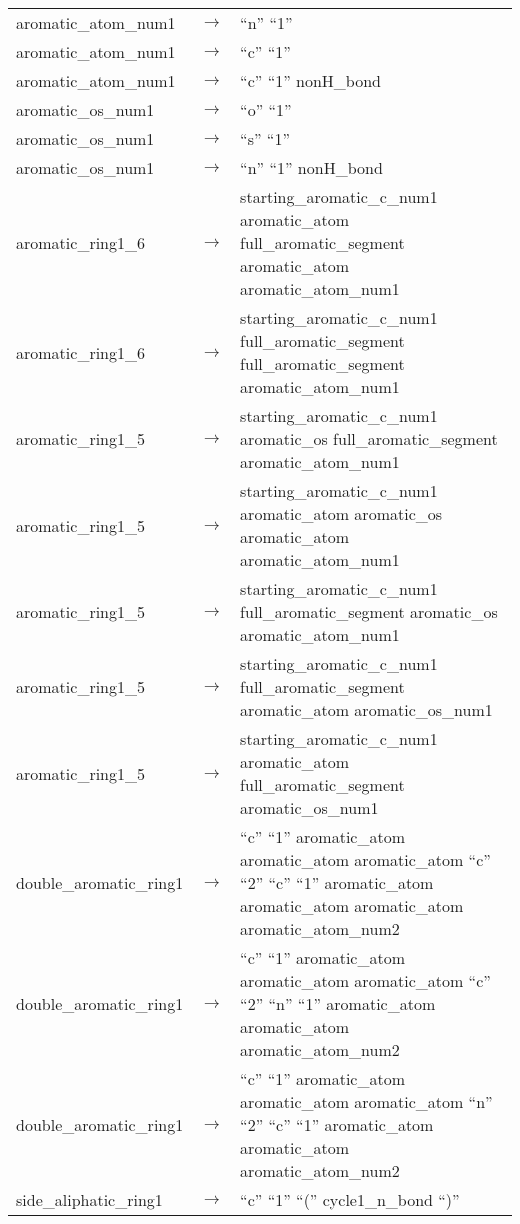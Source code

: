 \documentclass[../Document.tex]{subfiles}
\begin{document}
\begin{longtable}{m{} p{} p{}}
    aromatic\_atom\_num1 & $\rightarrow$ & ``n'' ``1'' \\
    aromatic\_atom\_num1 & $\rightarrow$ & ``c'' ``1'' \\
    aromatic\_atom\_num1 & $\rightarrow$ & ``c'' ``1'' nonH\_bond \\
    aromatic\_os\_num1 & $\rightarrow$ & ``o'' ``1'' \\
    aromatic\_os\_num1 & $\rightarrow$ & ``s'' ``1'' \\
    aromatic\_os\_num1 & $\rightarrow$ & ``n'' ``1'' nonH\_bond \\
    aromatic\_ring1\_6 & $\rightarrow$ & starting\_aromatic\_c\_num1 aromatic\_atom full\_aromatic\_segment aromatic\_atom aromatic\_atom\_num1 \\
    aromatic\_ring1\_6 & $\rightarrow$ & starting\_aromatic\_c\_num1 full\_aromatic\_segment full\_aromatic\_segment aromatic\_atom\_num1 \\
    aromatic\_ring1\_5 & $\rightarrow$ & starting\_aromatic\_c\_num1 aromatic\_os full\_aromatic\_segment aromatic\_atom\_num1 \\
    aromatic\_ring1\_5 & $\rightarrow$ & starting\_aromatic\_c\_num1 aromatic\_atom aromatic\_os aromatic\_atom aromatic\_atom\_num1 \\
    aromatic\_ring1\_5 & $\rightarrow$ & starting\_aromatic\_c\_num1 full\_aromatic\_segment aromatic\_os aromatic\_atom\_num1 \\
    aromatic\_ring1\_5 & $\rightarrow$ & starting\_aromatic\_c\_num1 full\_aromatic\_segment aromatic\_atom aromatic\_os\_num1 \\
    aromatic\_ring1\_5 & $\rightarrow$ & starting\_aromatic\_c\_num1 aromatic\_atom full\_aromatic\_segment aromatic\_os\_num1 \\
    double\_aromatic\_ring1 & $\rightarrow$ & ``c'' ``1'' aromatic\_atom aromatic\_atom aromatic\_atom ``c'' ``2'' ``c'' ``1'' aromatic\_atom aromatic\_atom aromatic\_atom aromatic\_atom\_num2 \\
    double\_aromatic\_ring1 & $\rightarrow$ & ``c'' ``1'' aromatic\_atom aromatic\_atom aromatic\_atom ``c'' ``2'' ``n'' ``1'' aromatic\_atom aromatic\_atom aromatic\_atom\_num2 \\
    double\_aromatic\_ring1 & $\rightarrow$ & ``c'' ``1'' aromatic\_atom aromatic\_atom aromatic\_atom ``n'' ``2'' ``c'' ``1'' aromatic\_atom aromatic\_atom aromatic\_atom\_num2 \\
    side\_aliphatic\_ring1 & $\rightarrow$ & ``c'' ``1'' ``('' cycle1\_n\_bond ``)'' \\

\end{longtable}
\end{document}
